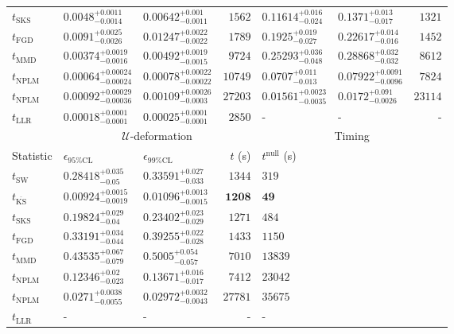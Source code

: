 \begin{tabular}{l|llr|llr}
	$t_{\mathrm{SKS}}$ & $0.0048_{-0.0014}^{+0.0011}$ & $0.00642_{-0.0011}^{+0.001}$ & $1562$ & $0.11614_{-0.024}^{+0.016}$ & $0.1371_{-0.017}^{+0.013}$ & $1321$ \\
	$t_{\mathrm{FGD}}$ & $0.0091_{-0.0026}^{+0.0025}$ & $0.01247_{-0.0022}^{+0.0022}$ & $1789$ & $0.1925_{-0.027}^{+0.019}$ & $0.22617_{-0.016}^{+0.014}$ & $1452$ \\
	$t_{\mathrm{MMD}}$ & $0.00374_{-0.0016}^{+0.0019}$ & $0.00492_{-0.0015}^{+0.0019}$ & $9724$ & $0.25293_{-0.048}^{+0.036}$ & $0.28868_{-0.032}^{+0.032}$ & $8612$ \\
\rowcolor{red!35}	$t_{\mathrm{NPLM}}$ & $0.00064_{-0.00024}^{+0.00024}$ & $0.00078_{-0.00022}^{+0.00022}$ & $10749$ & $0.0707_{-0.013}^{+0.011}$ & $0.07922_{-0.0096}^{+0.0091}$ & $7824$ \\
\rowcolor{blue!35}	$t_{\mathrm{NPLM}}$ & $0.00092_{-0.00036}^{+0.00029}$ & $0.00109_{-0.0003}^{+0.00026}$ & $27203$ & $0.01561_{-0.0035}^{+0.0023}$ & $0.0172_{-0.0026}^{+0.091}$ & $23114$ \\
	$t_{\mathrm{LLR}}$ & $0.00018_{-0.0001}^{+0.0001}$ & $0.00025_{-0.0001}^{+0.0001}$ & $2850$ & - & - & - \\
	\toprule
	\multicolumn{1}{c}{} & \multicolumn{3}{c}{$\mathcal{U}$-deformation} & \multicolumn{3}{c}{Timing} \\
	Statistic & $\epsilon_{95\%\mathrm{CL}}$ & $\epsilon_{99\%\mathrm{CL}}$ & $t$ (s) & $t^{\mathrm{null}}$ (s) \\
	\midrule
	$t_{\mathrm{SW}}$ & $0.28418_{-0.05}^{+0.035}$ & $0.33591_{-0.033}^{+0.027}$ & $1344$ & $319$ \\
	$t_{\overline{\mathrm{KS}}}$ & ${\mathbf{0.00924_{-0.0019}^{+0.0015}}}$ & ${\mathbf{0.01096_{-0.0015}^{+0.0013}}}$ & ${\mathbf{1208}}$ & ${\mathbf{49}}$ \\
	$t_{\mathrm{SKS}}$ & $0.19824_{-0.04}^{+0.029}$ & $0.23402_{-0.029}^{+0.023}$ & $1271$ & $484$ \\
	$t_{\mathrm{FGD}}$ & $0.33191_{-0.044}^{+0.034}$ & $0.39255_{-0.028}^{+0.022}$ & $1433$ & $1150$ \\
	$t_{\mathrm{MMD}}$ & $0.43535_{-0.079}^{+0.067}$ & $0.5005_{-0.057}^{+0.054}$ & $7010$ & $13839$ \\
\rowcolor{red!35}	$t_{\mathrm{NPLM}}$ & $0.12346_{-0.023}^{+0.02}$ & $0.13671_{-0.017}^{+0.016}$ & $7412$ & $23042$ \\
\rowcolor{blue!35}	$t_{\mathrm{NPLM}}$ & $0.0271_{-0.0055}^{+0.0038}$ & $0.02972_{-0.0043}^{+0.0032}$ & $27781$ & $35675$ \\
	$t_{\mathrm{LLR}}$ & - & - & - & - \\
	\bottomrule
\end{tabular}